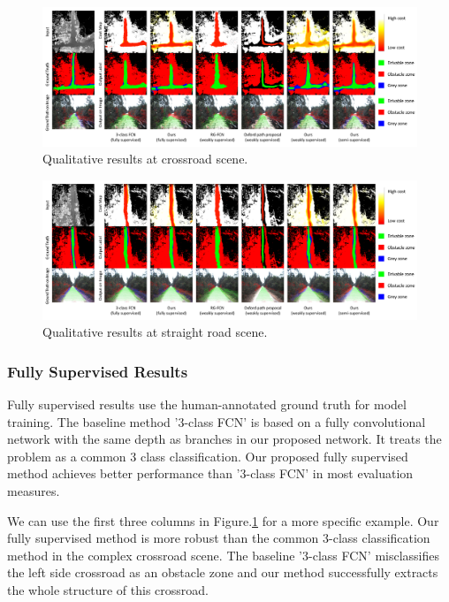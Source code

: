 \documentclass[letterpaper, 10 pt, conference]{ieeeconf}  %
\begin{document}
\begin{figure}[ht]
	\centering
	\includegraphics[scale=0.15]{crossRoad.pdf}
	\caption{Qualitative results at crossroad scene.}
	\label{fig:cross_road}
	\vspace{-2mm}
\end{figure}
\begin{figure}[ht]
	\centering
	\includegraphics[scale=0.15]{straightRoad.pdf}
	\caption{Qualitative results at straight road scene.}
	\label{fig:straight_road}
\end{figure}

\subsubsection{Fully Supervised Results}
Fully supervised results use the human-annotated ground truth for model training. The baseline method '3-class FCN' is based on a fully convolutional network\cite{long2015fully} with the same depth as branches in our proposed network. It treats the problem as a common 3 class classification. Our proposed fully supervised method achieves better performance than '3-class FCN' in most evaluation measures.

We can use the first three columns in Figure.\ref{fig:cross_road} for a more specific example. Our fully supervised method is more robust than the common 3-class classification method in the complex crossroad scene. The baseline '3-class FCN' misclassifies the left side crossroad as an obstacle zone and our method successfully extracts the whole structure of this crossroad.
\end{document}
